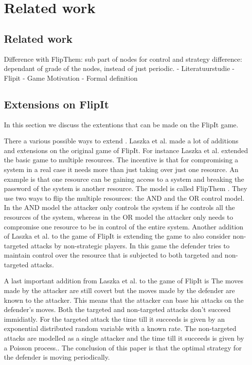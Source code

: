 \chapter{Related work}
\label{cha:1}



\section{Related work}

Difference with FlipThem: sub part of nodes for control and strategy difference: dependant of grade of the nodes, instead of just periodic.
- Literatuurstudie
- Flipit
- Game Motivation
- Formal definition

\section{Extensions on FlipIt}

In this section we discuss the extentions that can be made on the FlipIt game. 


There a various possible ways to extend . 
Laszka et al. made a lot of additions and extensions on the original game of FlipIt. For instance Laszka et al. extended the basic  game to multiple resources. The incentive is that for compromising a system in a real case it needs more than just taking over just one resource. An example is that one resource can be gaining access to a system and breaking the password of the system is another resource. The model is called FlipThem \cite{FlipThem}. They use two ways to flip the multiple resources: the AND and the OR control model. In the AND model the attacker only controls the system if he controls all the resources of the system, whereas in the OR model the attacker only needs to compromise one resource to be in control of the entire system. %
Another addition of Laszka et al. to the game of FlipIt is extending the game to also consider non-targeted attacks by non-strategic players. In this game the defender tries to maintain control over the resource that is subjected to both targeted and non-targeted attacks.

A last important addition from Laszka et al. to the game of FlipIt is   The moves made by the attacker are still covert but the moves made by the defender are known to the attacker. This means that the attacker can base his attacks on the defender's moves. Both the targeted and non-targeted attacks don't succeed immidiatly. For the targeted attack the time till it succeeds is given by an exponential distributed random variable with a known rate. The non-targeted attacks are modelled as a single attacker and the time till it succeeds is given by a Poisson process.. The conclusion of this paper is that the optimal strategy for the defender is moving periodically. 
 

